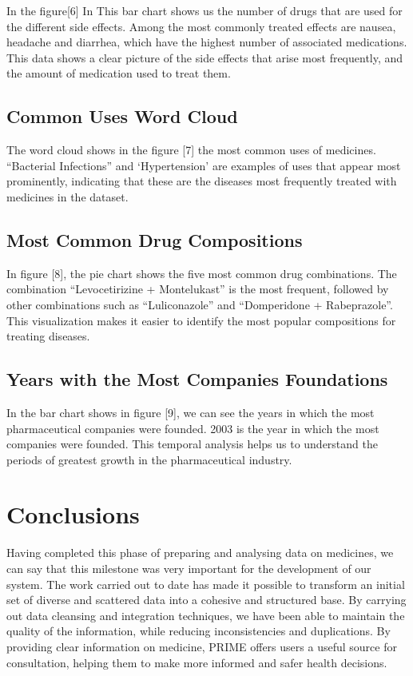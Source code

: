 \documentclass[sigconf]{acmart}
\begin{document}
In the figure[6] In This bar chart shows us the number of drugs that are used for the different side effects. Among the most commonly treated effects are nausea, headache and diarrhea, which have the highest number of associated medications. This data shows a clear picture of the side effects that arise most frequently, and the amount of medication used to treat them.

\subsection{Common Uses Word Cloud}

The word cloud shows in the figure [7] the most common uses of medicines. “Bacterial Infections” and ‘Hypertension’ are examples of uses that appear most prominently, indicating that these are the diseases most frequently treated with medicines in the dataset.

\subsection{Most Common Drug Compositions}

In figure [8], the pie chart shows the five most common drug combinations. The combination “Levocetirizine + Montelukast” is the most frequent, followed by other combinations such as “Luliconazole” and “Domperidone + Rabeprazole”. This visualization makes it easier to identify the most popular compositions for treating diseases.

\subsection{Years with the Most Companies Foundations}	

In the bar chart shows in figure [9], we can see the years in which the most pharmaceutical companies were founded. 2003 is the year in which the most companies were founded. This temporal analysis helps us to understand the periods of greatest growth in the pharmaceutical industry.

\section{Conclusions}

Having completed this phase of preparing and analysing data on medicines, we can say that this milestone was very important for the development of our system. The work carried out to date has made it possible to transform an initial set of diverse and scattered data into a cohesive and structured base. By carrying out data cleansing and integration techniques, we have been able to maintain the quality of the information, while reducing inconsistencies and duplications. By providing clear information on medicine, PRIME offers users a useful source for consultation, helping them to make more informed and safer health decisions.
\end{document}
